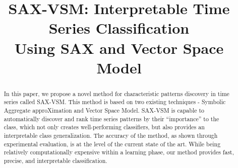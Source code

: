 \documentclass[conference]{IEEEtran}
\begin{document}
%
\title{\huge\textbf{SAX-VSM: Interpretable Time Series Classification\\ Using SAX and Vector Space Model}}
\author{
 \and
 \vspace{-2ex}}
\bigskip
\maketitle

\bigskip

\begin{abstract}
In this paper, we propose a novel method for characteristic patterns discovery in 
time series called SAX-VSM. This method is based on two existing techniques - 
Symbolic Aggregate approXimation and Vector Space Model. SAX-VSM is capable 
to automatically discover and rank time series patterns by their 
“importance” to the class, which not only creates well-performing classifiers,
but also provides an interpretable class generalization. 
The accuracy of the method, as shown through experimental evaluation, is at the 
level of the current state of the art. 
While being relatively computationally expensive within a learning phase, 
our method provides fast, precise, and interpretable classification.
\end{abstract}
\end{document}
